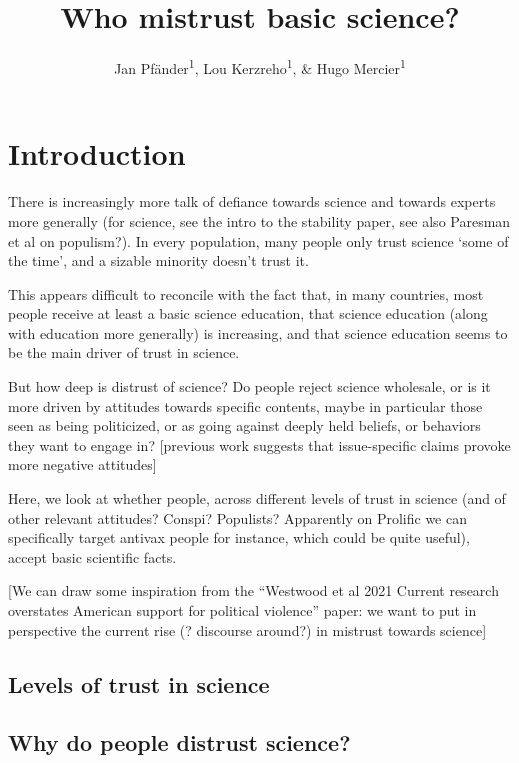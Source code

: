 \documentclass[
  doc,floatsintext]{apa6}
\title{Who mistrust basic science?}
\author{Jan Pfänder\textsuperscript{1}, Lou Kerzreho\textsuperscript{1}, \& Hugo Mercier\textsuperscript{1}}
\date{}
\affiliation{\vspace{0.5cm}\textsuperscript{1} Institut Jean Nicod, Département d'études cognitives, ENS, EHESS, PSL University, CNRS, France}
\begin{document}
\maketitle

\hypertarget{introduction}{%
\section{Introduction}\label{introduction}}

There is increasingly more talk of defiance towards science and towards experts more generally (for science, see the intro to the stability paper, see also Paresman et al on populism?). In every population, many people only trust science `some of the time', and a sizable minority doesn't trust it.

This appears difficult to reconcile with the fact that, in many countries, most people receive at least a basic science education, that science education (along with education more generally) is increasing, and that science education seems to be the main driver of trust in science.

But how deep is distrust of science? Do people reject science wholesale, or is it more driven by attitudes towards specific contents, maybe in particular those seen as being politicized, or as going against deeply held beliefs, or behaviors they want to engage in? {[}previous work suggests that issue-specific claims provoke more negative attitudes{]}

Here, we look at whether people, across different levels of trust in science (and of other relevant attitudes? Conspi? Populists? Apparently on Prolific we can specifically target antivax people for instance, which could be quite useful), accept basic scientific facts.

{[}We can draw some inspiration from the ``Westwood et al 2021 Current research overstates American support for political violence'' paper: we want to put in perspective the current rise (? discourse around?) in mistrust towards science{]}

\hypertarget{levels-of-trust-in-science}{%
\subsection{Levels of trust in science}\label{levels-of-trust-in-science}}

\hypertarget{why-do-people-distrust-science}{%
\subsection{Why do people distrust science?}\label{why-do-people-distrust-science}}
\end{document}
